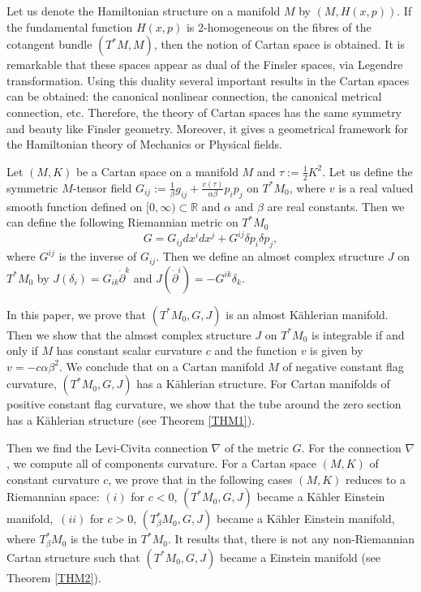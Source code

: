 \documentclass[10pt,a4paper]{article}
\theoremstyle{plain}
\theoremstyle{definition}
\begin{document}
Let us denote the Hamiltonian structure on a manifold $M$ by $(M,
H(x,p))$. If the fundamental function $H(x,p)$ is 2-homogeneous
on the fibres of the cotangent bundle $(T^*M, M)$, then the
notion of Cartan space is obtained. It is remarkable that these
spaces appear as dual of the Finsler spaces, via Legendre
transformation. Using this duality several important results in
the Cartan spaces can be obtained: the canonical nonlinear
connection, the canonical metrical connection, etc. Therefore, the
theory of Cartan spaces has the same symmetry and beauty like
Finsler geometry. Moreover, it gives a geometrical framework for
the Hamiltonian theory of Mechanics or Physical fields.


Let $(M,K)$ be a Cartan space on a manifold $M$ and $\tau :=\frac{1}{2}K^2$. Let us  define the
symmetric $M$-tensor field $G_{ij}:=\frac{1}{\beta}g_{ij}+\frac{v(\tau )}{\alpha \beta }p_{i}p_{j}$ on $T^{\ast}M_0$,
where $v$ is  a real valued smooth function  defined on $[0,\infty)\subset {\mathbb R} $ and $\alpha $ and $\beta$ are real constants. Then we can define the following Riemannian metric on $T^{\ast}M_0$
\[
G=G_{ij}dx^{i}dx^{j}+G^{ij}\delta p_{i}\delta p_{j},
\]
where $G^{ij}$ is the inverse of $G_{ij}$. Then we define an almost complex structure  $J$  on  $T^{\ast}M_0$
by $J(\delta _{i})=G_{ik}\dot{\partial}^k$ and $J(\dot{\partial}^i)=-G^{ik}\delta _k$.


In this paper, we prove that  $(T^{\ast}M_0,G,J)$ is an almost K\"{a}hlerian manifold. Then we show that the almost complex structure $J$ on $T^{\ast}M_0$ is integrable if and only if $M$ has constant scalar curvature $c$ and  the function $v$ is given  by $v=-c\alpha\beta^2$. We conclude that on a Cartan manifold $M$ of negative
constant flag curvature, $(T^{\ast}M_0,G,J)$ has  a K\"{a}hlerian structure. For Cartan manifolds of positive constant flag curvature, we show that the tube around the zero section has a K\"{a}hlerian structure (see Theorem \ref{THM1}).

Then we find the Levi-Civita connection $\nabla$ of the metric
$G$. For the connection $\nabla$, we compute all of components
curvature. For a Cartan space $(M,K)$ of  constant curvature $c$,
we prove that in the following cases $(M,K)$ reduces to a
Riemannian space: $(i)$ for $c<0$, $(T^{\ast}M_0,G,J)$ became a
K\"{a}hler Einstein manifold,\ $(ii)$ for $c>0$,
$(T_{\beta}^{\ast}M_0,G,J)$ became a K\"{a}hler Einstein manifold,
where $T_{\beta}^{\ast}M_0$ is the tube in $T^{\ast}M_0$.
It results that, there is not any non-Riemannian Cartan structure
such that $(T^{\ast}M_0, G, J)$ became a Einstein manifold (see Theorem \ref{THM2}).
\end{document}
